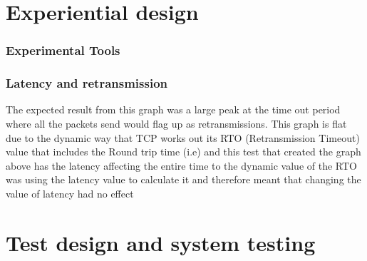 \section{Experiential design}

\subsubsection{Experimental Tools}



\subsubsection{Latency and retransmission}

The expected result from this graph was a large peak at the time out period where all the packets send would flag up as retransmissions. This graph is flat due to the dynamic way that TCP works out its RTO (Retransmission Timeout) value that includes the Round trip time (i.e) and this test that created the graph above has the latency affecting the entire time to the dynamic value of the RTO was using the latency value to calculate it and therefore meant that changing the value of latency had no effect 



\section{Test design and system testing}



